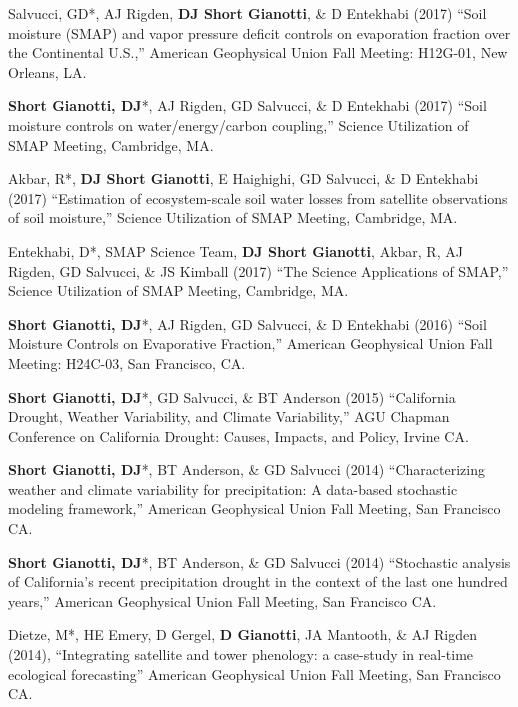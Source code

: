 \documentclass[10pt, a4paper]{article}
\newcommand{\lbr}{\vspace*{12pt}}
\newcommand{\years}[1]{\mbox{}\marginnote{\scriptsize #1}} %
\begin{document}
\years{2017}Salvucci, GD*, AJ Rigden, \textbf{DJ Short Gianotti}, \& D Entekhabi (2017) ``Soil moisture (SMAP) and vapor pressure deficit controls on evaporation fraction over the Continental U.S.,'' American Geophysical Union Fall Meeting: H12G-01, New Orleans, LA.\lbr

\years{2017}\textbf{Short Gianotti, DJ}*, AJ Rigden, GD Salvucci, \& D Entekhabi (2017) ``Soil moisture controls on water/energy/carbon coupling,'' Science Utilization of SMAP Meeting, Cambridge, MA.\lbr

\years{2017}Akbar, R*, \textbf{DJ Short Gianotti}, E Haighighi, GD Salvucci, \& D Entekhabi (2017) ``Estimation of ecosystem-scale soil water losses from satellite observations of soil moisture,'' Science Utilization of SMAP Meeting, Cambridge, MA.\lbr %

\years{2017}Entekhabi, D*, SMAP Science Team, \textbf{DJ Short Gianotti}, Akbar, R, AJ Rigden, GD Salvucci, \& JS Kimball (2017) ``The Science Applications of SMAP,'' Science Utilization of SMAP Meeting, Cambridge, MA.\lbr %

\years{2016}\textbf{Short Gianotti, DJ}*, AJ Rigden, GD Salvucci, \& D Entekhabi (2016) ``Soil Moisture Controls on Evaporative Fraction,'' American Geophysical Union Fall Meeting: H24C-03, San Francisco, CA.\lbr

\years{2015}\textbf{Short Gianotti, DJ}*, GD Salvucci, \& BT Anderson (2015) ``California Drought, Weather Variability, and Climate Variability,'' AGU Chapman Conference on California Drought: Causes, Impacts, and Policy, Irvine CA.\lbr

\years{2014}\textbf{Short Gianotti, DJ}*, BT Anderson, \& GD Salvucci (2014) ``Characterizing weather and climate variability for precipitation: A data-based stochastic modeling framework,'' American Geophysical Union Fall Meeting, San Francisco CA.\lbr

\years{2014}\textbf{Short Gianotti, DJ}*, BT Anderson, \& GD Salvucci (2014) ``Stochastic analysis of California's recent precipitation drought in the context of the last one hundred years,'' American Geophysical Union Fall Meeting, San Francisco CA.\lbr

\years{2014}Dietze, M*, HE Emery, D Gergel, \textbf{D Gianotti}, JA Mantooth, \& AJ Rigden (2014), ``Integrating satellite and tower phenology: a case-study in real-time ecological forecasting'' American Geophysical Union Fall Meeting, San Francisco CA.\lbr
\end{document}
